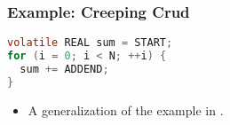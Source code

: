 \begin{frame}[fragile]

\frametitle{Example: Creeping Crud \cite{gustafson-2015}}

\begin{lstlisting}[language=c,numbers=none]
volatile REAL sum = START;
for (i = 0; i < N; ++i) {
  sum += ADDEND;
}
\end{lstlisting}

\begin{itemize}

\item A generalization of the example in \cite{gustafson-2015}.

\end{itemize}

\end{frame}
